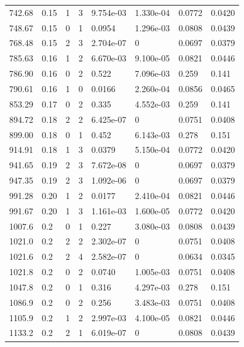 \documentclass[preview]{standalone}
\begin{document}
{{{\begin{tabular}{L{1.2cm}C{1.2cm} C{0.3cm}C{0.5cm} C{1.4cm}C{1.4cm} C{1.4cm}C{1.4cm}}
  742.68  &  0.15  & 1     &  3 &  9.754e-03  & 1.330e-04  & 0.0772 &  0.0420   \\ 
  748.67  &  0.15  & 0     &  1 &  0.0954  & 1.296e-03  & 0.0808 &  0.0439   \\ 
  768.48  &  0.15  & 2     &  3 &  2.704e-07  & 0  & 0.0697 &  0.0379   \\ 
  785.63  &  0.16  & 1     &  2 &  6.670e-03  & 9.100e-05  & 0.0821 &  0.0446   \\ 
  786.90  &  0.16  & 0     &  2 &  0.522  & 7.096e-03  & 0.259 &  0.141   \\ 
  790.61  &  0.16  & 1     &  0 &  0.0166  & 2.260e-04  & 0.0856 &  0.0465   \\ 
  853.29  &  0.17  & 0     &  2 &  0.335  & 4.552e-03  & 0.259 &  0.141   \\ 
  894.72  &  0.18  & 2     &  2 &  6.425e-07  & 0  & 0.0751 &  0.0408   \\ 
  899.00  &  0.18  & 0     &  1 &  0.452  & 6.143e-03  & 0.278 &  0.151   \\ 
  914.91  &  0.18  & 1     &  3 &  0.0379  & 5.150e-04  & 0.0772 &  0.0420   \\ 
  941.65  &  0.19  & 2     &  3 &  7.672e-08  & 0  & 0.0697 &  0.0379   \\ 
  947.35  &  0.19  & 2     &  3 &  1.092e-06  & 0  & 0.0697 &  0.0379   \\ 
  991.28  &  0.20  & 1     &  2 &  0.0177  & 2.410e-04  & 0.0821 &  0.0446   \\ 
  991.67  &  0.20  & 1     &  3 &  1.161e-03  & 1.600e-05  & 0.0772 &  0.0420   \\ 
  1007.6  &   0.2  & 0     &  1 &  0.227  & 3.080e-03  & 0.0808 &  0.0439   \\ 
  1021.0  &   0.2  & 2     &  2 &  2.302e-07  & 0  & 0.0751 &  0.0408   \\ 
  1021.6  &   0.2  & 2     &  4 &  2.582e-07  & 0  & 0.0634 &  0.0345   \\ 
  1021.8  &   0.2  & 0     &  2 &  0.0740  & 1.005e-03  & 0.0751 &  0.0408   \\ 
  1047.8  &   0.2  & 0     &  1 &  0.316  & 4.297e-03  & 0.278 &  0.151   \\ 
  1086.9  &   0.2  & 0     &  2 &  0.256  & 3.483e-03  & 0.0751 &  0.0408   \\ 
  1105.9  &   0.2  & 1     &  2 &  2.997e-03  & 4.100e-05  & 0.0821 &  0.0446   \\ 
  1133.2  &   0.2  & 2     &  1 &  6.019e-07  & 0  & 0.0808 &  0.0439   \\ 

\end{tabular}}}}
\end{document}
